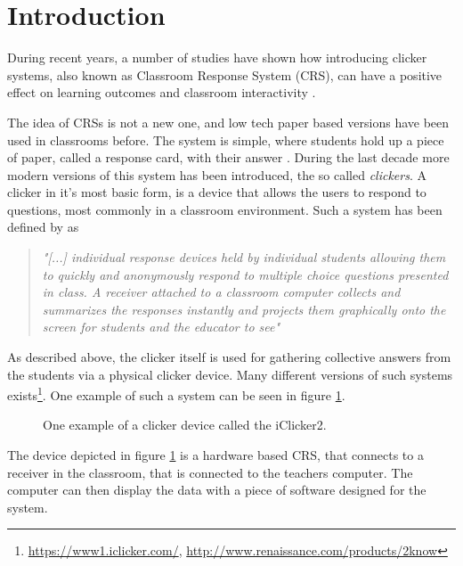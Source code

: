 \section{Introduction}
During recent years, a number of studies have shown how introducing clicker systems, also known as Classroom Response System (CRS), can have a positive effect on learning outcomes and classroom interactivity \cite{yourstone2008classroom, siau2006use, lantz2014effectiveness}.

The idea of CRSs is not a new one, and low tech paper based versions have been used in classrooms before. The system is simple, where students hold up a piece of paper, called a response card, with their answer \cite{ralph1994effects}. During the last decade more modern versions of this system has been introduced, the so called \emph{clickers}. A clicker in it's most basic form, is a device that allows the users to respond to questions, most commonly in a classroom environment. Such a system has been defined by  as 

\begin{quote}
    \emph{"[...] individual response devices held by individual students allowing them to quickly and anonymously respond to multiple choice questions presented in class. A receiver attached to a classroom computer collects and summarizes the responses instantly and projects them graphically onto the screen for students and the educator to see"} \cite[p.~280]{lantz2014effectiveness}
\end{quote}

As described above, the clicker itself is used for gathering collective answers from the students via a physical clicker device. Many different versions of such systems exists\footnote{\url{https://www1.iclicker.com/}, \url{http://www.renaissance.com/products/2know}}. One example of such a system can be seen in figure \ref{fig:iclicker}.

\begin{figure}[H]
\capstart
	\centering
	\caption[iClicker2]{One example of a clicker device called the iClicker2.}\label{fig:iclicker}
\end{figure}

The device depicted in figure \ref{fig:iclicker} is a hardware based CRS, that connects to a receiver in the classroom, that is connected to the teachers computer. The computer can then display the data with a piece of software designed for the system.

